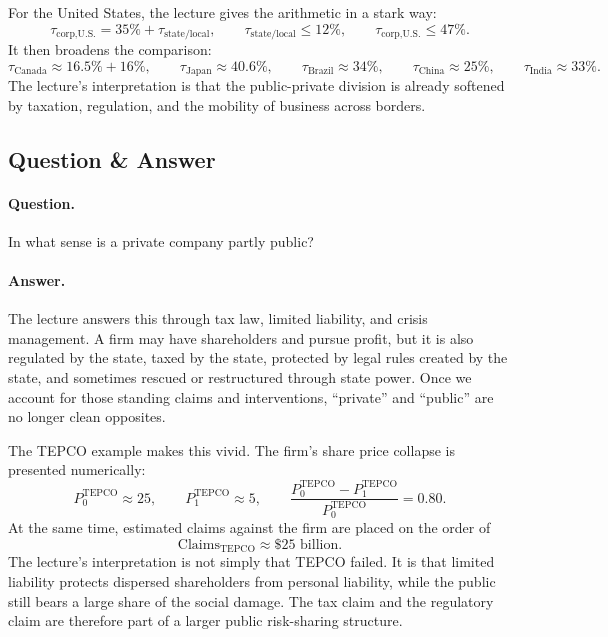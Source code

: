For the United States, the lecture gives the arithmetic in a stark way:
\begin{equation}
\tau_{\text{corp,U.S.}} = 35\% + \tau_{\text{state/local}},
\qquad
\tau_{\text{state/local}} \le 12\%,
\qquad
\tau_{\text{corp,U.S.}} \le 47\%.
\end{equation}
It then broadens the comparison:
\begin{equation}
\tau_{\text{Canada}} \approx 16.5\% + 16\%,
\qquad
\tau_{\text{Japan}} \approx 40.6\%,
\qquad
\tau_{\text{Brazil}} \approx 34\%,
\qquad
\tau_{\text{China}} \approx 25\%,
\qquad
\tau_{\text{India}} \approx 33\%.
\end{equation}
The lecture's interpretation is that the public-private division is already softened by taxation, regulation, and the mobility of business across borders.

\subsection{Question \& Answer}

\paragraph{Question.} In what sense is a private company partly public?

\paragraph{Answer.} The lecture answers this through tax law, limited liability, and crisis management. A firm may have shareholders and pursue profit, but it is also regulated by the state, taxed by the state, protected by legal rules created by the state, and sometimes rescued or restructured through state power. Once we account for those standing claims and interventions, ``private'' and ``public'' are no longer clean opposites.

The TEPCO example makes this vivid. The firm's share price collapse is presented numerically:
\begin{equation}
P_0^{\text{TEPCO}} \approx 25,
\qquad
P_1^{\text{TEPCO}} \approx 5,
\qquad
\frac{P_0^{\text{TEPCO}}-P_1^{\text{TEPCO}}}{P_0^{\text{TEPCO}}}=0.80.
\end{equation}
At the same time, estimated claims against the firm are placed on the order of
\begin{equation}
\text{Claims}_{\text{TEPCO}} \approx \$25\text{ billion}.
\end{equation}
The lecture's interpretation is not simply that TEPCO failed. It is that limited liability protects dispersed shareholders from personal liability, while the public still bears a large share of the social damage. The tax claim and the regulatory claim are therefore part of a larger public risk-sharing structure.


